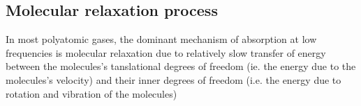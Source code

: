 \documentclass{Note}
\begin{document}
\subsection{Molecular relaxation process}
In most polyatomic gases, the dominant mechanism of absorption at low frequencies is molecular relaxation due to relatively slow transfer of energy between the molecules's tanslational degrees of freedom (ie. the energy due to the molecules's velocity) and their inner degrees of freedom (i.e. the energy due to rotation and vibration of the molecules)
\end{document}
